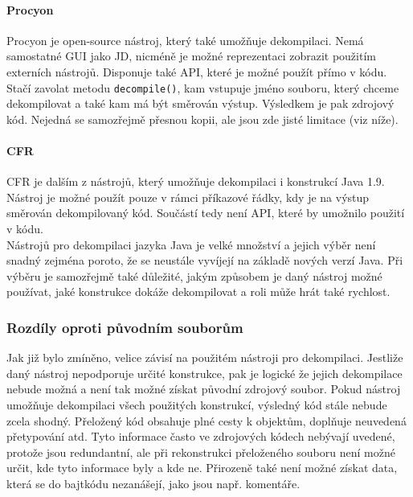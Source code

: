 				\paragraph{Procyon}
					Procyon \cite{procyon} je open-source nástroj, který také umožňuje dekompilaci. Nemá samostatné GUI jako JD, nicméně je možné reprezentaci zobrazit použitím externích nástrojů. Disponuje také API, které je možné použít přímo v kódu. Stačí zavolat metodu \texttt{decompile()}, kam vstupuje jméno souboru, který chceme dekompilovat a také kam má být směrován výstup. Výsledkem je pak zdrojový kód. Nejedná se samozřejmě přesnou kopii, ale jsou zde jisté limitace (viz níže).
					
				\paragraph{CFR}
					CFR \cite{cfr} je dalším z nástrojů, který umožňuje dekompilaci i konstrukcí Java 1.9. Nástroj je možné použít pouze v rámci příkazové řádky, kdy je na výstup směrován dekompilovaný kód. Součástí tedy není API, které by umožnilo použití v kódu.\\
					
				Nástrojů pro dekompilaci jazyka Java je velké množství a jejich výběr není snadný zejména poroto, že se neustále vyvíjejí na základě nových verzí Java. Při výběru je samozřejmě také důležité, jakým způsobem je daný nástroj možné používat, jaké konstrukce dokáže dekompilovat a roli může hrát také rychlost.
				
			\subsubsection{Rozdíly oproti původním souborům}
				Jak již bylo zmíněno, velice závisí na použitém nástroji pro dekompilaci. Jestliže daný nástroj nepodporuje určité konstrukce, pak je logické že jejich dekompilace nebude možná a není tak možné získat původní zdrojový soubor. Pokud nástroj umožňuje dekompilaci všech použitých konstrukcí, výsledný kód stále nebude zcela shodný. Přeložený kód obsahuje plné cesty k objektům, doplňuje neuvedená přetypování atd. Tyto informace často ve zdrojových kódech nebývají uvedené, protože jsou redundantní, ale při rekonstrukci přeloženého souboru není možné určit, kde tyto informace byly a kde ne. Přirozeně také není možné získat data, která se do bajtkódu nezanášejí, jako jsou např. komentáře.
